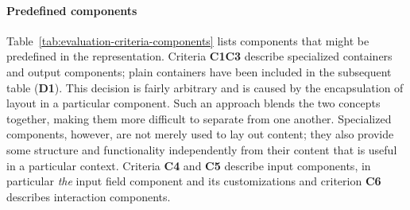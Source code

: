 \paragraph{Predefined components}

Table~\ref{tab:evaluation-criteria-components} lists components that might be predefined in the representation.
Criteria \textbf{C1}\textendash\textbf{C3} describe specialized containers and output components;
plain containers have been included in the subsequent table (\textbf{D1}).
This decision is fairly arbitrary and is caused by the encapsulation of layout in a particular component.
Such an approach blends the two concepts together, making them more difficult to separate from one another.
Specialized components, however, are not merely used to lay out content;
they also provide some structure and functionality independently from their content that is useful in a particular context.
Criteria \textbf{C4} and \textbf{C5} describe input components, in particular \emph{the} input field component and its customizations and criterion \textbf{C6} describes interaction components.

